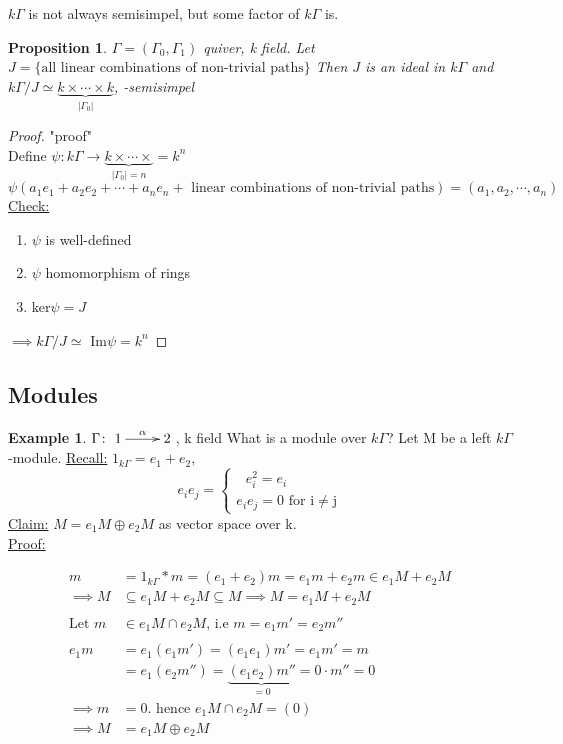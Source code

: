 \documentclass{amsart}
\numberwithin{equation}{section}
\newtheorem{prop}[thm]{Proposition}
\theoremstyle{definition}
\newtheorem{exam}[thm]{Example}
\newcommand{\G}{\Gamma}
\begin{document}
$k\G$ is not always semisimpel, but some factor of $k\G$ is.\newline

\begin{prop}
	$\G=(\G_0,\G_1) $ quiver, k field. Let $J = \{\text{all linear combinations of non-trivial paths}\}$
	Then $J$ is an ideal in $k\G$ and $k\G/J \simeq \underbrace{k \times \cdots \times k}_{|\G_0|}$, -semisimpel
\end{prop}

\begin{proof}"proof"\\
	Define $\psi\colon k\G \rightarrow \underbrace{k \times \cdots \times}_{|\G_0|=n} = k^n $\\
	$\psi(a_1e_1 + a_2e_2 + \cdots + a_ne_n + \text{ linear combinations of non-trivial paths} ) = (a_1, a_2, \cdots, a_n)$\\\newline
	\underline{Check:} \begin{enumerate}
		\item  $\psi$ is well-defined
		\item $\psi$ homomorphism of rings
		\item ker$\psi=J$
	\end{enumerate}
	$\implies k\G/J \simeq$ Im$\psi=k^n$
\end{proof}

\subsection{Modules}
\begin{exam}
	$\Gamma\colon \xymatrix{1\ar[r]^\alpha & 2}$, k field
	What is a module over $k\G$? Let M be a left $k\G$-module.
	\underline{Recall:} 
	$1_{k\G}=e_1 + e_2$, \[e_ie_j=  
	\begin{cases}	\text{\ $e_i^2 = e_i$}\\
	\text{$e_ie_j = 0$ for i$\neq$j}
	\end{cases}\]
	\underline{Claim:} $M = e_1M\oplus e_2M$ as vector space over k.\\\newline
	\underline{Proof:}
	
	\begin{align*}
	m &= 1_{k\G}*m=(e_1 + e_2)m = e_1m+e_2m \in e_1M + e_2M\\
	\implies M &\subseteq e_1M + e_2M \subseteq M \implies M = e_1M + e_2M\\\\
	\text{Let } m&\in e_1M \cap e_2M \text{, i.e } m=e_1m'=e_2m''\\\\
	e_1m&=e_1(e_1m')=(e_1e_1)m'=e_1m'=m\\
	&= e_1(e_2m'')=\underbrace{(e_1e_2)m''}_{=0}=0\cdot m''=0\\
	\implies m &=0. \text{ hence } e_1M \cap e_2M = (0)\\
	\implies M &= e_1M \oplus e_2M\\ 
	\end{align*}
	
	
	
\end{exam}
\end{document}
